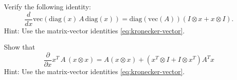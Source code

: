 \begin{exercise}
   Verify the following identity:
   \[
      \frac{d}{dx}
      \mathrm{vec}(
         \mathrm{diag}(x)\, A\, \mathrm{diag}(x)
         )
         = \mathrm{diag}(\mathrm{vec}(A)) (I \otimes x + x \otimes I)
         .
   \]
      Hint: Use the matrix-vector identities \eqref{eq:kronecker-vector}.
\end{exercise}

\begin{exercise}
      Show that
      \[
         \frac{\partial}{\partial x} x^T\, A\, (x \otimes x)
         =
         A(x\otimes x) + (x^T \otimes I + I \otimes x^T) A^T x
      \]
      Hint: Use the matrix-vector identities \eqref{eq:kronecker-vector}.
\end{exercise}

